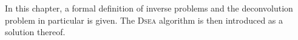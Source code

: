 In this chapter,
  a formal definition of
    inverse problems
    and the deconvolution problem in particular
  is given.
The \textsc{Dsea} algorithm is then introduced
  as a solution thereof.
